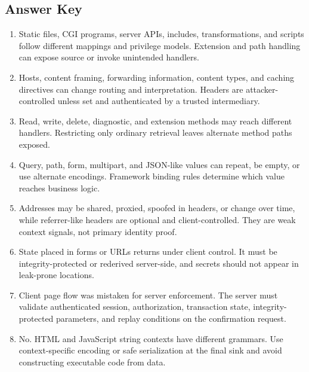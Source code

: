 \documentclass[11pt,letterpaper]{article}
\begin{document}
\subsection*{Answer Key}
\begin{enumerate}
\item Static files, CGI programs, server APIs, includes, transformations, and scripts follow different mappings and privilege models. Extension and path handling can expose source or invoke unintended handlers.
\item Hosts, content framing, forwarding information, content types, and caching directives can change routing and interpretation. Headers are attacker-controlled unless set and authenticated by a trusted intermediary.
\item Read, write, delete, diagnostic, and extension methods may reach different handlers. Restricting only ordinary retrieval leaves alternate method paths exposed.
\item Query, path, form, multipart, and JSON-like values can repeat, be empty, or use alternate encodings. Framework binding rules determine which value reaches business logic.
\item Addresses may be shared, proxied, spoofed in headers, or change over time, while referrer-like headers are optional and client-controlled. They are weak context signals, not primary identity proof.
\item State placed in forms or URLs returns under client control. It must be integrity-protected or rederived server-side, and secrets should not appear in leak-prone locations.
\item Client page flow was mistaken for server enforcement. The server must validate authenticated session, authorization, transaction state, integrity-protected parameters, and replay conditions on the confirmation request.
\item No. HTML and JavaScript string contexts have different grammars. Use context-specific encoding or safe serialization at the final sink and avoid constructing executable code from data.
\end{enumerate}
\end{document}
